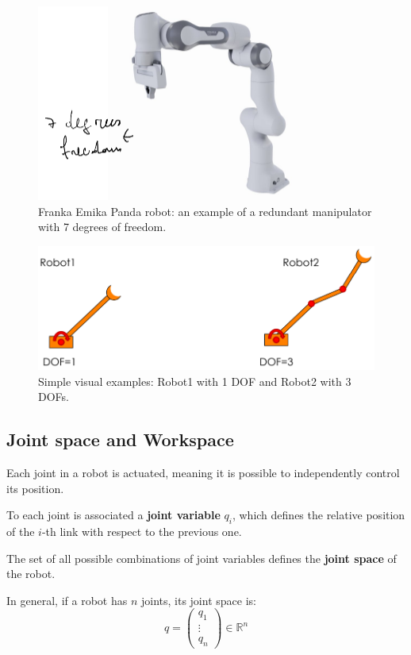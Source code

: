 \begin{figure}[H]
  \centering
  \includegraphics[width=0.4\linewidth]{imgs/franka_panda.png}
  \caption{Franka Emika Panda robot: an example of a redundant manipulator with 7 degrees of freedom.}
\end{figure}

\begin{figure}[H]
  \centering
  \includegraphics[width=0.8\linewidth]{imgs/dof_examples.png}
  \caption{Simple visual examples: Robot1 with 1 DOF and Robot2 with 3 DOFs.}
\end{figure}

\hfill

\subsection{Joint space and Workspace}

Each joint in a robot is actuated, meaning it is possible to independently control its position. 

To each joint is associated a \textbf{joint variable} $q_i$, which defines the relative position of the $i$-th link with respect to the previous one.

The set of all possible combinations of joint variables defines the \textbf{joint space} of the robot.

In general, if a robot has $n$ joints, its joint space is:
\[
q = 
\begin{pmatrix}
q_1 \\
\vdots \\
q_n
\end{pmatrix}
\in \mathbb{R}^n
\]


